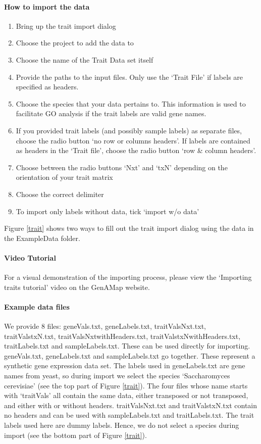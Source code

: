 \documentclass{article}
\begin{document}
\paragraph{How to import the data} 
\begin{enumerate}
\item Bring up the trait import dialog
\item Choose the project to add the data to
\item Choose the name of the Trait Data set itself
\item Provide the paths to the input files. Only use the `Trait File' if labels are specified as headers.
\item Choose the species that your data pertains to. This information is used to facilitate GO analysis if the trait labels are valid gene names.
\item If you provided trait labels (and possibly sample labels) as separate files, choose the radio button `no row or columns headers'. If labels are contained as headers in the `Trait file', choose the radio button `row \& column headers'.
\item Choose between the radio buttons `Nxt' and `txN' depending on the orientation of your trait matrix
\item Choose the correct delimiter
\item To import only labels without data, tick `import w/o data'
\end{enumerate}

Figure \ref{trait} shows two ways to fill out the trait import dialog using the data in the ExampleData folder.

\paragraph{Video Tutorial}

For a visual demonstration of the importing process, please view the `Importing traits tutorial' video on the GenAMap website.

\paragraph{Example data files} We provide 8 files: geneVals.txt, geneLabels.txt, traitValsNxt.txt, traitValstxN.txt, traitValsNxtwithHeaders.txt, traitValstxNwithHeaders.txt, traitLabels.txt and sampleLabels.txt. These can be used directly for importing. geneVals.txt, geneLabels.txt and sampleLabels.txt go together. These represent a synthetic gene expression data set. The labels used in geneLabels.txt are gene names from yeast, so during import we select the species `Saccharomyces cerevisiae' (see the top part of Figure \ref{trait}). The four files whose name starts with `traitVals' all contain the same data, either transposed or not transposed, and either with or without headers. traitValsNxt.txt and traitValstxN.txt contain no headers and can be used with sampleLabels.txt and traitLabels.txt. The trait labels used here are dummy labels. Hence, we do not select a species during import (see the bottom part of Figure \ref{trait}).
\end{document}
